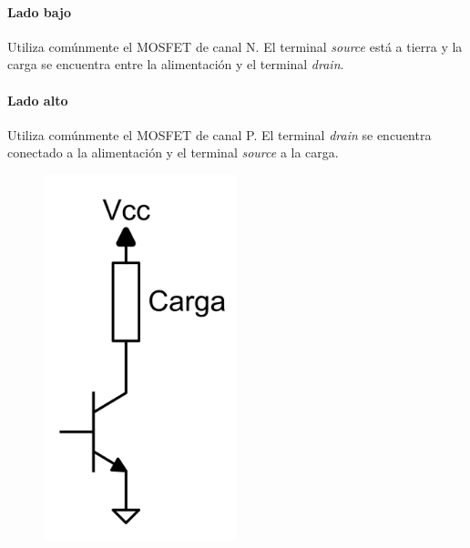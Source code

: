 \paragraph{Lado bajo} Utiliza comúnmente el MOSFET de canal N. 
El terminal \textit{source} está a tierra y la carga se encuentra entre la alimentación y el terminal \textit{drain}. 

\paragraph{Lado alto} Utiliza comúnmente el MOSFET de canal P. 
El terminal \textit{drain} se encuentra conectado a la alimentación y el terminal \textit{source} a la carga.\\

\begin{figure}[H]
    \centering
    \centering
    \begin{minipage}{0.45\textwidth}
        \centering
        \includegraphics[width=0.5\textwidth]{images/low_high_side/Low_Side.png}
    \end{minipage}
    \begin{minipage}{0.45\textwidth}
        \centering

\end{minipage}
\end{figure}
